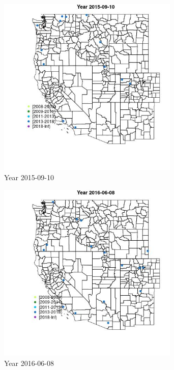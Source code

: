 \begin{figure} 
\centering  
\includegraphics[width=0.77\textwidth]{Code_Outputs/Report_ML_input_PM25_Step4_part_e_de_duplicated_aves_MapObsYear2015-09-10.jpg} 
\caption{\label{fig:Report_ML_input_PM25_Step4_part_e_de_duplicated_avesMapObsYear2015-09-10}Year 2015-09-10} 
\end{figure} 
 

\begin{figure} 
\centering  
\includegraphics[width=0.77\textwidth]{Code_Outputs/Report_ML_input_PM25_Step4_part_e_de_duplicated_aves_MapObsYear2016-06-08.jpg} 
\caption{\label{fig:Report_ML_input_PM25_Step4_part_e_de_duplicated_avesMapObsYear2016-06-08}Year 2016-06-08} 
\end{figure} 
 

